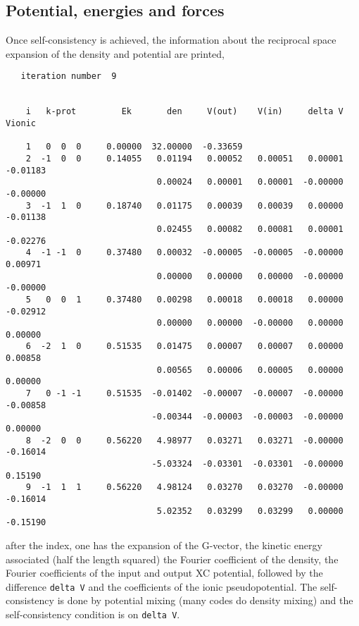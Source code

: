 \documentclass[11pt]{article}
\begin{document}
\subsection{Potential, energies and forces}

Once self-consistency is achieved, the information about the reciprocal space expansion of
the density and potential are printed,

\begin{verbatim}
   iteration number  9


    i   k-prot         Ek       den     V(out)    V(in)     delta V   Vionic

    1   0  0  0     0.00000  32.00000  -0.33659
    2  -1  0  0     0.14055   0.01194   0.00052   0.00051   0.00001  -0.01183
                              0.00024   0.00001   0.00001  -0.00000  -0.00000
    3  -1  1  0     0.18740   0.01175   0.00039   0.00039   0.00000  -0.01138
                              0.02455   0.00082   0.00081   0.00001  -0.02276
    4  -1 -1  0     0.37480   0.00032  -0.00005  -0.00005  -0.00000   0.00971
                              0.00000   0.00000   0.00000  -0.00000  -0.00000
    5   0  0  1     0.37480   0.00298   0.00018   0.00018   0.00000  -0.02912
                              0.00000   0.00000  -0.00000   0.00000   0.00000
    6  -2  1  0     0.51535   0.01475   0.00007   0.00007   0.00000   0.00858
                              0.00565   0.00006   0.00005   0.00000   0.00000
    7   0 -1 -1     0.51535  -0.01402  -0.00007  -0.00007  -0.00000  -0.00858
                             -0.00344  -0.00003  -0.00003  -0.00000   0.00000
    8  -2  0  0     0.56220   4.98977   0.03271   0.03271  -0.00000  -0.16014
                             -5.03324  -0.03301  -0.03301  -0.00000   0.15190
    9  -1  1  1     0.56220   4.98124   0.03270   0.03270  -0.00000  -0.16014
                              5.02352   0.03299   0.03299   0.00000  -0.15190
\end{verbatim}
after the index, one has the expansion of the G-vector, the kinetic energy associated
(half the length squared) the Fourier coefficient of the density,
the Fourier coefficients of the input and output XC potential, followed by the difference {\tt delta V}
and the coefficients of the ionic pseudopotential.
The self-consistency is done by potential mixing (many codes do density mixing) and the
self-consistency condition is on  {\tt delta V}.
\end{document}
